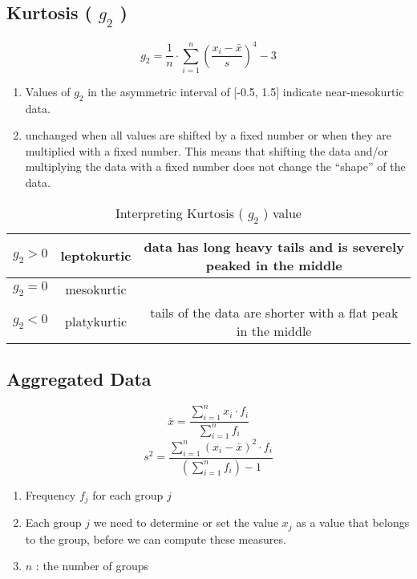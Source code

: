 \subsection{Kurtosis ( $g_2$ ) \cite{ism-1}}\label{Kurtosis}
\[
    g_2 = \displaystyle\dfrac{1}{n} \cdot \sum_{i=1}^{n} \left( \dfrac{x_i - \bar{x}}{s} \right)^4 - 3
\]

\begin{enumerate}
    \item Values of $g_2$ in the asymmetric interval of [-0.5, 1.5] indicate near-mesokurtic data.
    \item unchanged when all values are shifted by a fixed number or when they are multiplied with a fixed number. This means that shifting the data and/or multiplying the data with a fixed number does not change the “shape” of the data.
\end{enumerate}

\begin{table}
    \centering
    \begin{tabular}{|c|c|c|}
        \hline
        $g_2 > 0$ & leptokurtic & data has long heavy tails and is severely peaked in the middle \\ \hline
        $g_2 = 0$ & mesokurtic & \\ \hline
        $g_2 < 0$ & platykurtic & tails of the data are shorter with a flat peak in the middle \\ \hline
    \end{tabular}
    \caption{Interpreting Kurtosis ( $g_2$ ) value}
\end{table}

\subsection{Aggregated Data \cite{ism-1}}\label{Aggregated Data}
\[
    \bar{x} = \displaystyle\dfrac{\sum_{i=1}^{n} x_i \cdot f_i}{\sum_{i=1}^{n} f_i}
\]
\[
    s^2 = \displaystyle\dfrac{\sum_{i=1}^{n} (x_i - \bar{x})^2 \cdot f_i}{\left( \sum_{i=1}^{n} f_i \right) - 1}
\]

\begin{enumerate}
    \item Frequency $f_j$ for each group $j$
    \item Each group $j$ we need to determine or set the value $x_j$ as a value that belongs to the group, before we can compute these measures.
    \item $n$ : the number of groups
\end{enumerate}





















